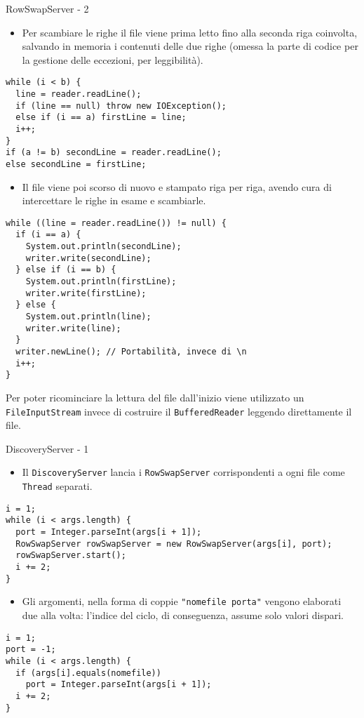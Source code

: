 \documentclass[8pt]{beamer}
\begin{document}
\begin{frame}[fragile]{RowSwapServer - 2}
\begin{itemize}
\item Per scambiare le righe il file viene prima letto fino alla seconda riga coinvolta, salvando in memoria i contenuti delle due righe (omessa la parte di codice per la gestione delle eccezioni, per leggibilità).
\end{itemize}
\small
\begin{verbatim}
while (i < b) {
  line = reader.readLine();
  if (line == null) throw new IOException();
  else if (i == a) firstLine = line;
  i++;
}
if (a != b) secondLine = reader.readLine();
else secondLine = firstLine;
\end{verbatim}
\normalsize
\begin{itemize}
\item Il file viene poi scorso di nuovo e stampato riga per riga, avendo cura di intercettare le righe in esame e scambiarle. 
\end{itemize}
\small
\begin{verbatim}
while ((line = reader.readLine()) != null) {
  if (i == a) {
    System.out.println(secondLine);
    writer.write(secondLine);
  } else if (i == b) {
    System.out.println(firstLine);
    writer.write(firstLine);
  } else {
    System.out.println(line);
    writer.write(line);
  }
  writer.newLine(); // Portabilità, invece di \n
  i++;
}
\end{verbatim}
\normalsize
\vspace{0.6em}
Per poter ricominciare la lettura del file dall'inizio viene utilizzato un \texttt{FileInputStream} invece di costruire il \texttt{BufferedReader} leggendo direttamente il file.
\end{frame}
\begin{frame}[fragile]{DiscoveryServer - 1}
\begin{itemize}
\item Il \texttt{DiscoveryServer} lancia i \texttt{RowSwapServer} corrispondenti a ogni file come \texttt{Thread} separati.
\end{itemize}
\begin{verbatim}
i = 1;
while (i < args.length) {
  port = Integer.parseInt(args[i + 1]);
  RowSwapServer rowSwapServer = new RowSwapServer(args[i], port);
  rowSwapServer.start();
  i += 2;
}
\end{verbatim}
\begin{itemize}
\item Gli argomenti, nella forma di coppie \texttt{"nomefile porta"} vengono elaborati due alla volta: l'indice del ciclo, di conseguenza, assume solo valori dispari.
\end{itemize}
\begin{verbatim}
i = 1;
port = -1;
while (i < args.length) {
  if (args[i].equals(nomefile))
    port = Integer.parseInt(args[i + 1]);
  i += 2;
}
\end{verbatim}
\end{frame}
\end{document}
